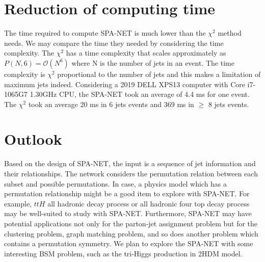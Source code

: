 \section{Reduction of computing time}\label{sec: reduce of time uasge}
The time required to compute SPA-NET is much lower than the $\chi^{2}$ method needs. We may compare the time they needed by considering the time complexity. The $\chi^{2}$ has a time complexity that scales approximately as $P(N,6)=\mathcal{O}(N^{6})$ where N is the number of jets in an event. The time complexity is $\chi^{2}$ proportional to the number of jets and this makes a limitation of maximum jets indeed. Considering a 2019 DELL XPS13 computer with Core i7-1065G7 1.30GHz CPU, the SPA-NET took an average of 4.4 ms for one event.  The $\chi^{2}$ took an average 20 ms in 6 jets events and 369 ms in $\ge$ 8 jets events. 
\section{Outlook}\label{sec:outlook}
Based on the design of SPA-NET, the input is a sequence of jet information and their relationships. The network considers the permutation relation between each subset and possible permutations. In case, a physics model which has a permutation relationship might be a good item to explore with SPA-NET. For example, $ttH$ all hadronic decay process or all hadronic four top decay process may be well-suited to study with SPA-NET. Furthermore, SPA-NET may have potential applications not only for the parton-jet assignment problem but for the clustering problem, graph matching problem, and so does another problem which contains a permutation symmetry. We plan to explore the SPA-NET with some interesting BSM problem, such as the tri-Higgs production in 2HDM model\cite{Low:2020iua}.



